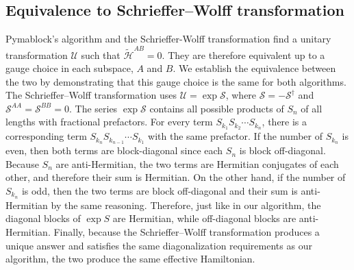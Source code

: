 \subsection{Equivalence to Schrieffer--Wolff transformation}
\label{seq:SW_equivalence}
Pymablock's algorithm and the Schrieffer-Wolff transformation find a unitary transformation $\mathcal{U}$ such that $\tilde{\mathcal{H}}^{AB}=0$.
They are therefore equivalent up to a gauge choice in each subspace, $A$ and $B$.
We establish the equivalence between the two by demonstrating that this gauge choice is the same for both algorithms.
The Schrieffer--Wolff transformation uses $\mathcal{U} = \exp \mathcal{S}$, where $\mathcal{S} = -\mathcal{S}^\dagger$ and $\mathcal{S}^{AA} = \mathcal{S}^{BB} = 0$.
The series $\exp\mathcal{S}$ contains all possible products of $S_n$ of all lengths with fractional prefactors.
For every term $S_{k_1}S_{k_2}\cdots S_{k_n}$, there is a corresponding term $S_{k_n}S_{k_{n-1}}\cdots S_{k_1}$ with the same prefactor.
If the number of $S_{k_n}$ is even, then both terms are block-diagonal since each $S_n$ is block off-diagonal.
Because $S_n$ are anti-Hermitian, the two terms are Hermitian conjugates of each other, and therefore their sum is Hermitian.
On the other hand, if the number of $S_{k_n}$ is odd, then the two terms are block off-diagonal and their sum is anti-Hermitian by the same reasoning.
Therefore, just like in our algorithm, the diagonal blocks of $\exp S$ are Hermitian, while off-diagonal blocks are anti-Hermitian.
Finally, because the Schrieffer--Wolff transformation produces a unique answer and satisfies the same diagonalization requirements as our algorithm, the two produce the same effective Hamiltonian.

